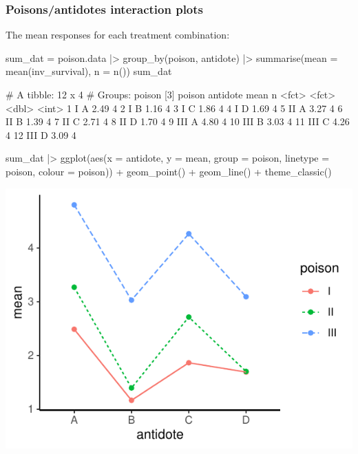 \documentclass[a4paper]{article}\usepackage[]{graphicx}\usepackage[]{xcolor}
\makeatletter
\def\maxwidth{ %
  \ifdim\Gin@nat@width>\linewidth
    \linewidth
  \else
    \Gin@nat@width
  \fi
}
\makeatother
\begin{document}
\subsubsection{Poisons/antidotes interaction plots}
The mean responses for each treatment combination:
\begin{Schunk}
\begin{Sinput}
sum_dat = poison.data |> group_by(poison, antidote) |> 
  summarise(mean = mean(inv_survival),
            n = n())
sum_dat
\end{Sinput}
\begin{Soutput}
# A tibble: 12 x 4
# Groups:   poison [3]
   poison antidote  mean     n
   <fct>  <fct>    <dbl> <int>
 1 I      A         2.49     4
 2 I      B         1.16     4
 3 I      C         1.86     4
 4 I      D         1.69     4
 5 II     A         3.27     4
 6 II     B         1.39     4
 7 II     C         2.71     4
 8 II     D         1.70     4
 9 III    A         4.80     4
10 III    B         3.03     4
11 III    C         4.26     4
12 III    D         3.09     4
\end{Soutput}
\end{Schunk}
\begin{minipage}[t]{0.49\textwidth}
\begin{Schunk}
\begin{Sinput}
sum_dat |> 
  ggplot(aes(x = antidote, y = mean,
             group = poison, 
             linetype = poison,
             colour = poison)) + 
  geom_point() +
  geom_line() + 
  theme_classic()
\end{Sinput}


{\centering \includegraphics[width=\maxwidth]{figure/listings-unnamed-chunk-316-1} 

}

\end{Schunk}
\end{minipage}
\end{document}
